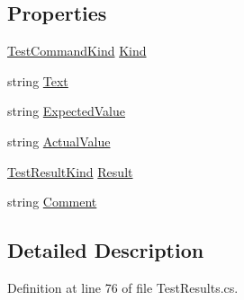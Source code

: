 \subsection*{Properties}
\begin{DoxyCompactItemize}
\item 
\hyperlink{namespace_software_engineering_tools_1_1_testing_aa56e9d89003821b285e6eac88565f13a}{Test\+Command\+Kind} \hyperlink{class_software_engineering_tools_1_1_testing_1_1_test_command_result_a7f7e746bda7b3cd7cb1125c0e9f805f9}{Kind}
\item 
string \hyperlink{class_software_engineering_tools_1_1_testing_1_1_test_command_result_a2f1d65eb07c34822f08e885f844ca0b2}{Text}
\item 
string \hyperlink{class_software_engineering_tools_1_1_testing_1_1_test_command_result_a17ca5a787ca781abace162b7d7a0a3b9}{Expected\+Value}
\item 
string \hyperlink{class_software_engineering_tools_1_1_testing_1_1_test_command_result_ae17ea10460ef9dacbd3cbe9345e0f9ed}{Actual\+Value}
\item 
\hyperlink{namespace_software_engineering_tools_1_1_testing_a8aff450bdbdae45d2f8a72713e102ba2}{Test\+Result\+Kind} \hyperlink{class_software_engineering_tools_1_1_testing_1_1_test_command_result_aa8ac8fa72a9daa74b028ffafab0fbdd1}{Result}
\item 
string \hyperlink{class_software_engineering_tools_1_1_testing_1_1_test_command_result_a02274834bcb07e11f6027e5371cacc9c}{Comment}
\end{DoxyCompactItemize}


\subsection{Detailed Description}


Definition at line 76 of file Test\+Results.\+cs.



